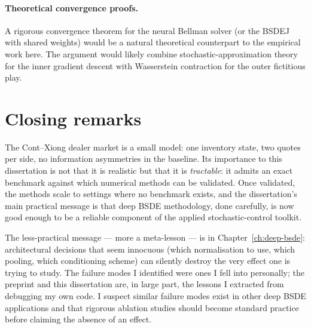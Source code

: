 \paragraph{Theoretical convergence proofs.}  A rigorous convergence theorem for the neural Bellman solver (or the BSDEJ with shared weights) would be a natural theoretical counterpart to the empirical work here. The argument would likely combine stochastic-approximation theory for the inner gradient descent with Wasserstein contraction for the outer fictitious play.

\section{Closing remarks}

The Cont--Xiong dealer market is a small model: one inventory state, two quotes per side, no information asymmetries in the baseline. Its importance to this dissertation is not that it is realistic but that it is \emph{tractable}: it admits an exact benchmark against which numerical methods can be validated. Once validated, the methods scale to settings where no benchmark exists, and the dissertation's main practical message is that deep BSDE methodology, done carefully, is now good enough to be a reliable component of the applied stochastic-control toolkit.

The less-practical message --- more a meta-lesson --- is in Chapter~\ref{ch:deep-bsde}: architectural decisions that seem innocuous (which normalisation to use, which pooling, which conditioning scheme) can silently destroy the very effect one is trying to study. The failure modes I identified were ones I fell into personally; the preprint and this dissertation are, in large part, the lessons I extracted from debugging my own code. I suspect similar failure modes exist in other deep BSDE applications and that rigorous ablation studies should become standard practice before claiming the absence of an effect.
